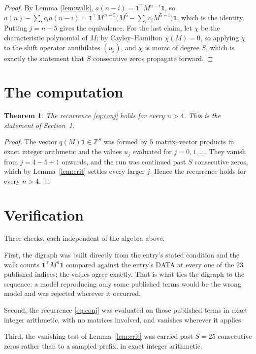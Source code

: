 \documentclass[11pt,a4paper]{article}
\theoremstyle{plain}
\newtheorem{theorem}{Theorem}
\theoremstyle{definition}
\begin{document}
\begin{proof}
By Lemma~\ref{lem:walk}, $a(n-i)=\mathbf{1}^{\!\top}M^{n-i}\mathbf{1}$, so
$a(n)-\sum_i c_i a(n-i)
=\mathbf{1}^{\!\top}M^{\,n-5}\bigl(M^{5}-\sum_i c_i M^{5-i}\bigr)
\mathbf{1}$, which is the identity. Putting $j=n-5$ gives the equivalence. For the
last claim, let $\chi$ be the characteristic polynomial of $M$; by Cayley--Hamilton
$\chi(M)=0$, so applying $\chi$ to the shift operator annihilates $(u_j)$, and $\chi$ is
monic of degree $S$, which is exactly the statement that $S$ consecutive zeros propagate
forward.
\end{proof}

\section{The computation}

\begin{theorem}
The recurrence \eqref{eq:conj} holds for every $n>4$. This is the statement of
Section~1.
\end{theorem}

\begin{proof}
The vector $q(M)\mathbf{1}\in\mathbb{Z}^{S}$ was formed by $5$ matrix--vector
products in exact integer arithmetic and the values $u_j$ evaluated for
$j=0,1,\dots$. They vanish from $j=4-5+1$ onwards, and the run was continued past
$S$ consecutive zeros, which by Lemma~\ref{lem:crit} settles every larger $j$. Hence the
recurrence holds for every $n>4$.
\end{proof}

\section{Verification}

Three checks, each independent of the algebra above.

First, the digraph was built directly from the entry's stated condition and the walk counts
$\mathbf{1}^{\!\top}M^{n}\mathbf{1}$ compared against the entry's DATA at every one of
the $23$ published indices; the values agree exactly. That is what ties the digraph to
the sequence: a model reproducing only some published terms would be the wrong model and
was rejected wherever it occurred.

Second, the recurrence \eqref{eq:conj} was evaluated on those published terms in exact
integer arithmetic, with no matrices involved, and vanishes wherever it applies.

Third, the vanishing test of Lemma~\ref{lem:crit} was carried past $S=25$ consecutive
zeros rather than to a sampled prefix, in exact integer arithmetic.
\end{document}
